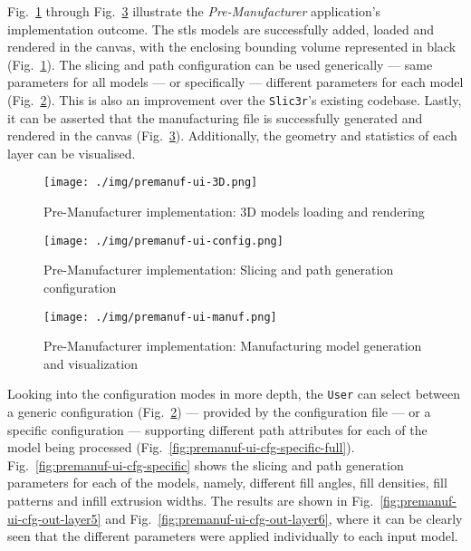 Fig.~\ref{fig:premanuf-ui-3D} through Fig.~\ref{fig:premanuf-ui-manuf}
illustrate the \emph{Pre-Manufacturer} application's implementation outcome. The \glspl{stl} models are
successfully added, loaded and rendered in the canvas, with the enclosing
bounding volume represented in black (Fig.~\ref{fig:premanuf-ui-3D}). The
slicing and path configuration can be used generically --- same parameters for
all models --- or specifically --- different parameters for each model (Fig.~\ref{fig:premanuf-ui-config}). This is
also an improvement over the \texttt{Slic3r}'s existing codebase. Lastly, it can be asserted
that the manufacturing file is successfully generated and rendered in the canvas
(Fig.~\ref{fig:premanuf-ui-manuf}). Additionally, the geometry and statistics of
each layer can be visualised.

\begin{figure}[!hbt]
  \centering
  \texttt{[image: ./img/premanuf-ui-3D.png]}
  \caption{Pre-Manufacturer implementation: 3D models loading and rendering}%
  \label{fig:premanuf-ui-3D}
\end{figure}

\begin{figure}[!hbt]
  \centering
  \texttt{[image: ./img/premanuf-ui-config.png]}
  \caption{Pre-Manufacturer implementation: Slicing and path generation configuration}%
  \label{fig:premanuf-ui-config}
\end{figure}

\begin{figure}[!hbt]
  \centering
  \texttt{[image: ./img/premanuf-ui-manuf.png]}
  \caption{Pre-Manufacturer implementation: Manufacturing model generation and visualization}%
  \label{fig:premanuf-ui-manuf}
\end{figure}

Looking into the configuration modes in more depth, the \texttt{User} can select
between a generic configuration (Fig.~\ref{fig:premanuf-ui-config}) ---
provided by the configuration file --- or a specific configuration ---
supporting different path attributes for each of the model being processed
(Fig.~\ref{fig:premanuf-ui-cfg-specific-full}). Fig.~\ref{fig:premanuf-ui-cfg-specific}
shows the slicing and path generation parameters for each of the models, namely,
different fill angles, fill densities, fill patterns and infill extrusion
widths. The results are shown in Fig.~\ref{fig:premanuf-ui-cfg-out-layer5}
and Fig.~\ref{fig:premanuf-ui-cfg-out-layer6}, where it can be clearly seen that
the different parameters were applied individually to each input model.

